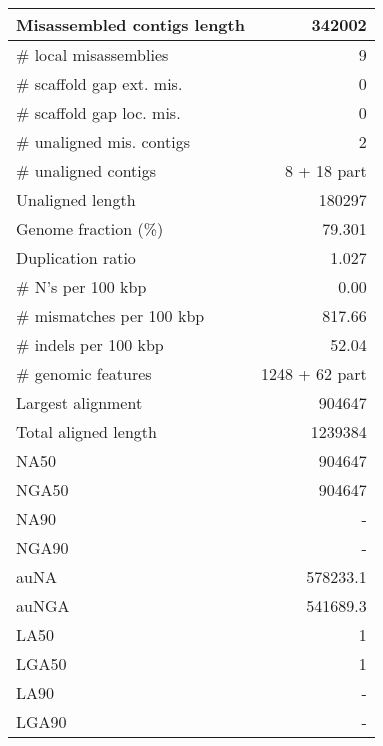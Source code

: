 \documentclass[12pt,a4paper]{article}
\begin{document}
\begin{table}[ht]
\begin{center}
\begin{tabular}{|l*{1}{|r}|}
Misassembled contigs length & 342002 \\ \hline
\# local misassemblies & 9 \\ \hline
\# scaffold gap ext. mis. & 0 \\ \hline
\# scaffold gap loc. mis. & 0 \\ \hline
\# unaligned mis. contigs & 2 \\ \hline
\# unaligned contigs & 8 + 18 part \\ \hline
Unaligned length & 180297 \\ \hline
Genome fraction (\%) & 79.301 \\ \hline
Duplication ratio & 1.027 \\ \hline
\# N's per 100 kbp & 0.00 \\ \hline
\# mismatches per 100 kbp & 817.66 \\ \hline
\# indels per 100 kbp & 52.04 \\ \hline
\# genomic features & 1248 + 62 part \\ \hline
Largest alignment & 904647 \\ \hline
Total aligned length & 1239384 \\ \hline
NA50 & 904647 \\ \hline
NGA50 & 904647 \\ \hline
NA90 & - \\ \hline
NGA90 & - \\ \hline
auNA & 578233.1 \\ \hline
auNGA & 541689.3 \\ \hline
LA50 & 1 \\ \hline
LGA50 & 1 \\ \hline
LA90 & - \\ \hline
LGA90 & - \\ \hline
\end{tabular}
\end{center}
\end{table}
\end{document}
